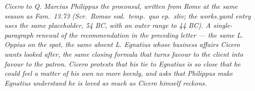 
\textit{Cicero to Q. Marcius Philippus the proconsul,
written from Rome at the same season as Fam.\ 13.73
(\textit{Scr.\ Romae eod.\ temp.\ quo ep.\ xliv}; the
works.yaml entry uses the same placeholder, 54 BC, with
an outer range to 44 BC). A single-paragraph renewal of
the recommendation in the preceding letter --- the same
L. Oppius on the spot, the same absent L. Egnatius
whose business affairs Cicero wants looked after, the
same closing formula that turns favour to the client
into favour to the patron. Cicero protests that his
tie to Egnatius is so close that he could feel a matter
of his own no more keenly, and asks that Philippus
make Egnatius understand he is loved as much as Cicero
himself reckons.}
